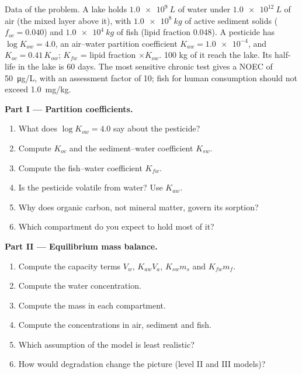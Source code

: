 \begin{problem}
\label{pb:b3:environmental-toxicology:1}
Data of the problem. A lake holds $\qty{1.0e9}{L}$ of water under $\qty{1.0e12}{L}$ of air (the mixed layer above it),
with $\qty{1.0e8}{kg}$ of active sediment solids ($f_{oc} = 0.040$) and $\qty{1.0e4}{kg}$ of fish (lipid fraction 0.048).
A pesticide has $\log K_{ow} = 4.0$, an air--water partition coefficient $K_{aw} = \num{1.0e-4}$, and $K_{oc} = 0.41\,K_{ow}$;
$K_{fw}$ = lipid fraction $\times K_{ow}$. 100 kg of it reach the lake. Its half-life in the lake is 60 days.
The most sensitive chronic test gives a NOEC of \qty{50}{\micro g/L}, with an assessment factor of 10;
fish for human consumption should not exceed \qty{1.0}{mg/kg}.

\medskip\noindent\textbf{Part I --- Partition coefficients.}
\begin{enumerate}
  \item What does $\log K_{ow} = 4.0$ say about the pesticide?
  \item Compute $K_{oc}$ and the sediment--water coefficient $K_{sw}$.
  \item Compute the fish--water coefficient $K_{fw}$.
  \item Is the pesticide volatile from water? Use $K_{aw}$.
  \item Why does organic carbon, not mineral matter, govern its sorption?
  \item Which compartment do you expect to hold most of it?
\end{enumerate}

\medskip\noindent\textbf{Part II --- Equilibrium mass balance.}
\begin{enumerate}[resume]
  \item Compute the capacity terms $V_w$, $K_{aw}V_a$, $K_{sw}m_s$ and $K_{fw}m_f$.
  \item Compute the water concentration.
  \item Compute the mass in each compartment.
  \item Compute the concentrations in air, sediment and fish.
  \item Which assumption of the model is least realistic?
  \item How would degradation change the picture (level II and III models)?
\end{enumerate}


\end{problem}
